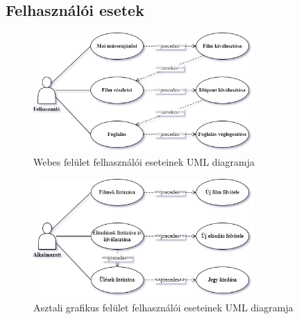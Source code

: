 \documentclass{article}
\begin{document}
	\subsection*{Felhasználói esetek}
	\begin{figure}[H]
		\centering
		\includegraphics[width=0.75\textwidth]{usercase_web}
		\caption{Webes felület felhasználói eseteinek UML diagramja}
	\end{figure}
	\begin{figure}[H]
		\centering
		\includegraphics[width=0.75\textwidth]{usercase_desktop}
		\caption{Asztali grafikus felület felhasználói eseteinek UML diagramja}
	\end{figure}
\end{document}
